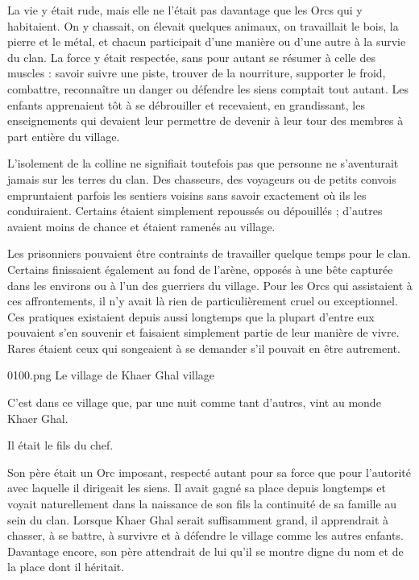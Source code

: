 La vie y était rude, mais elle ne l'était pas davantage que les Orcs qui y
habitaient. On y chassait, on élevait quelques animaux, on travaillait le bois,
la pierre et le métal, et chacun participait d'une manière ou d'une autre à la
survie du clan. La force y était respectée, sans pour autant se résumer à celle
des muscles : savoir suivre une piste, trouver de la nourriture, supporter le
froid, combattre, reconnaître un danger ou défendre les siens comptait tout
autant. Les enfants apprenaient tôt à se débrouiller et recevaient, en
grandissant, les enseignements qui devaient leur permettre de devenir à leur
tour des membres à part entière du village.

L'isolement de la colline ne signifiait toutefois pas que personne ne
s'aventurait jamais sur les terres du clan. Des chasseurs, des voyageurs ou de
petits convois empruntaient parfois les sentiers voisins sans savoir exactement
où ils les conduiraient. Certains étaient simplement repoussés ou dépouillés ;
d'autres avaient moins de chance et étaient ramenés au village.

Les prisonniers pouvaient être contraints de travailler quelque temps pour le
clan. Certains finissaient également au fond de l'arène, opposés à une bête
capturée dans les environs ou à l'un des guerriers du village. Pour les Orcs
qui assistaient à ces affrontements, il n'y avait là rien de particulièrement
cruel ou exceptionnel. Ces pratiques existaient depuis aussi longtemps que la
plupart d'entre eux pouvaient s'en souvenir et faisaient simplement partie de
leur manière de vivre. Rares étaient ceux qui songeaient à se demander s'il
pouvait en être autrement.

\illustration
  {0100.png}
  {Le village de Khaer Ghal}
  {village}

\scenebreak

C'est dans ce village que, par une nuit comme tant d'autres, vint au monde
Khaer Ghal.

Il était le fils du chef.

Son père était un Orc imposant, respecté autant pour sa force que pour
l'autorité avec laquelle il dirigeait les siens. Il avait gagné sa place depuis
longtemps et voyait naturellement dans la naissance de son fils la continuité
de sa famille au sein du clan. Lorsque Khaer Ghal serait suffisamment grand,
il apprendrait à chasser, à se battre, à survivre et à défendre le village
comme les autres enfants. Davantage encore, son père attendrait de lui qu'il se
montre digne du nom et de la place dont il héritait.


